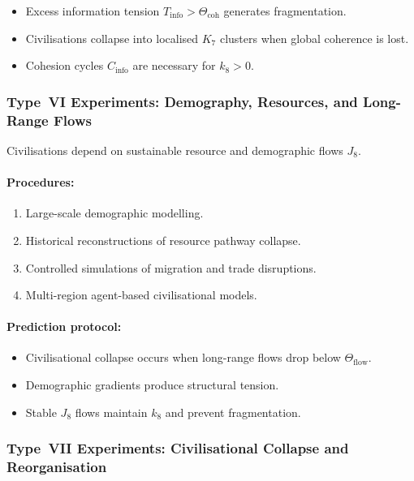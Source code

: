 \begin{itemize}
    \item Excess information tension $T_{\mathrm{info}} > \Theta_{\mathrm{coh}}$
          generates fragmentation.
    \item Civilisations collapse into localised $K_7$ clusters when
          global coherence is lost.
    \item Cohesion cycles $C_{\mathrm{info}}$ are necessary for $k_8 > 0$.
\end{itemize}



\subsubsection{Type~VI Experiments: Demography, Resources, and Long-Range Flows}

Civilisations depend on sustainable resource and demographic flows $J_8$.

\paragraph{Procedures:}

\begin{enumerate}
    \item Large-scale demographic modelling.
    \item Historical reconstructions of resource pathway collapse.
    \item Controlled simulations of migration and trade disruptions.
    \item Multi-region agent-based civilisational models.
\end{enumerate}

\paragraph{Prediction protocol:}

\begin{itemize}
    \item Civilisational collapse occurs when long-range flows drop below
          $\Theta_{\mathrm{flow}}$.
    \item Demographic gradients produce structural tension.
    \item Stable $J_8$ flows maintain $k_8$ and prevent fragmentation.
\end{itemize}



\subsubsection{Type~VII Experiments: Civilisational Collapse and Reorganisation}

